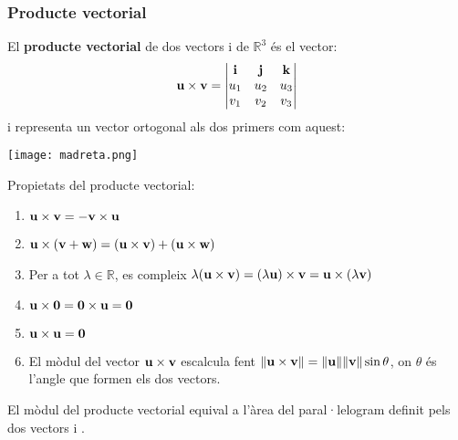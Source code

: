 \documentclass{beamer}
\begin{document}
\begin{frame}[allowframebreaks]
  \frametitle{Producte vectorial}

  El {\bf producte vectorial} de dos vectors  i  de $\mathbb{R}^3$ és el vector:
  \[
  \textbf{u} \times \textbf{v} =
  \begin{vmatrix}
  \textbf{i} & \textbf{j} & \textbf{k} \\
  u_1 & u_2 & u_3 \\
  v_1 & v_2 & v_3
  \end{vmatrix}
  \]
  i representa un vector ortogonal als dos primers com aquest:\cite{mcorbera}
  \begin{center}
    \texttt{[image: madreta.png]}
  \end{center}

\framebreak
  Propietats del producte vectorial:
  \begin{enumerate}
    \item $\textbf{u} \times \textbf{v}= - \textbf{v} \times \textbf{u}$
    \item $\textbf{u} \times (\textbf{v}+\textbf{w})=(\textbf{u} \times \textbf{v})+(\textbf{u} \times \textbf{w})$
    \item Per a tot $\lambda \in \mathbb{R}$, es compleix $\lambda(\textbf{u}\times\textbf{v})=(\lambda \textbf{u})\times\textbf{v}=\textbf{u}\times(\lambda\textbf{v})$
    \item $\textbf{u} \times \textbf{0}= \textbf{0} \times \textbf{u} = \textbf{0}$
    \item $\textbf{u} \times \textbf{u}=\textbf{0}$
    \item El mòdul del vector $\textbf{u} \times \textbf{v}$ escalcula fent $\norm{\textbf{u} \times \textbf{v}}=\norm{\textbf{u}}\norm{\textbf{v}}\sin{\theta}$, on $\theta$ és l'angle que formen els dos vectors.
  \end{enumerate}
  El mòdul del producte vectorial equival a l'àrea del paral·lelogram definit pels dos vectors  i .
\end{frame}
\end{document}
